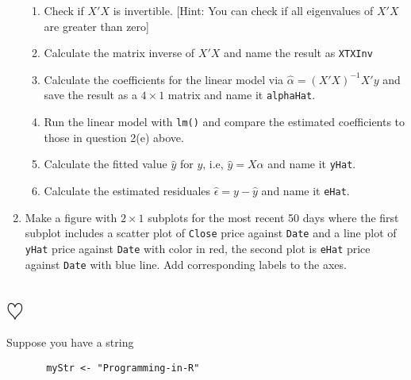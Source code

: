 \documentclass[a4paper]{article}
\begin{document}
\begin{enumerate}
\begin{enumerate}
  \item Check if $X'X$ is invertible. [Hint: You can check if all
    eigenvalues of $X'X$ are greater than zero]

  \item Calculate the matrix inverse of $X'X$ and name the result as \texttt{XTXInv}

  \item Calculate the coefficients for the linear model via $\hat \alpha = (X'X)^{-1} X'y $ and
    save the result as a $4\times 1$ matrix and name it \texttt{alphaHat}.

  \item Run the linear model with \texttt{lm()} and compare the estimated coefficients to
    those in question 2(e) above.

  \item Calculate the fitted value $\hat y$ for $y$, i.e, $\hat y = X \hat
    \alpha$ and name it \texttt{yHat}.
 
  \item Calculate the estimated residuales $\hat \epsilon = y - \hat y$ and
    name it \texttt{eHat}.

  \end{enumerate}

\item Make a figure with $2\times 1$ subplots for the most recent 50 days where
  the first subplot includes a scatter plot of \texttt{Close} price against
  \texttt{Date} and a line plot of \texttt{yHat} price against \texttt{Date}
  with color in red, the second plot is \texttt{eHat} price against
  \texttt{Date} with blue line. Add corresponding labels to the axes.

\end{enumerate}


\section{$\heartsuit$}
Suppose you have a string

\begin{verbatim}
       myStr <- "Programming-in-R"
\end{verbatim}
\end{document}
